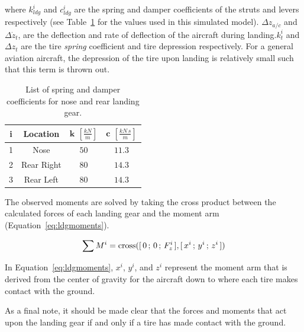where \(k^i_{ldg}\) and \(c^i_{ldg}\) are the spring and damper coefficients of the struts and levers respectively (see Table~\ref{tbl:ldgcoeff} for the values used in this simulated model). \(\Delta z_{a/c}\) and \(\Delta \dot{z}_t\), are the deflection and rate of deflection of the aircraft during landing.\( k^i_t \) and \(\Delta z_t\) are the tire \textit{spring} coefficient and tire depression respectively. For a general aviation aircraft, the depression of the tire upon landing is relatively small such that this term is thrown out.

\begin{table}[!ht]\label{tbl:ldgcoeff}
    \caption{List of spring and damper coefficients for nose and rear landing gear.}
    \centering
    \begin{tabular}{cccc}
        \toprule
        \textbf{i} & \textbf{Location} & \(\mathbf{k}\) \(  \left[\frac{kN}{m}\right]\) & \(\mathbf{c}\) \( \left[\frac{kN\,s}{m}\right]\) \\
        \midrule
        1          & Nose              & \(50\)                                         & \(11.3\)                                         \\
        2          & Rear Right        & \(80\)                                         & \(14.3\)                                         \\
        3          & Rear Left         & \(80\)                                         & \(14.3\)                                         \\
        \bottomrule
    \end{tabular}
\end{table}

The observed moments are solved by taking the cross product between the calculated forces of each landing gear and the moment arm (Equation~\ref{eq:ldgmoments}).

\begin{equation}
    \sum M^i = \textnormal{cross}([\,0\,;\,0\,;\,F^i_z\,],[\,x^i\,;\,y^i\,;\,z^i\,])
    \label{eq:ldgmoments}
\end{equation}

In Equation~\ref{eq:ldgmoments}, \(x^i\), \(y^i\), and \(z^i\) represent the moment arm that is derived from the center of gravity for the aircraft down to where each tire makes contact with the ground.

As a final note, it should be made clear that the forces and moments that act upon the landing gear if and only if a tire has made contact with the ground.


